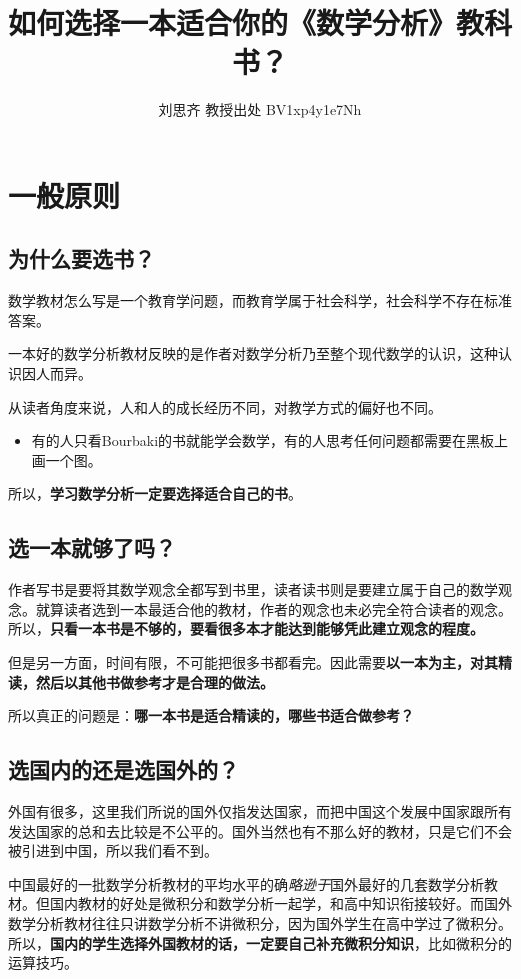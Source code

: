 \documentclass[UTF8]{article}
\title{如何选择一本适合你的《数学分析》教科书？}
\author{刘思齐 教授\qquad 出处 BV1xp4y1e7Nh}
\begin{document}
    \maketitle
    \tableofcontents
    \section{一般原则}
    \subsection{为什么要选书？}
    数学教材怎么写是一个教育学问题，而教育学属于社会科学，社会科学不存在标准答案。
    
    一本好的数学分析教材反映的是作者对数学分析乃至整个现代数学的认识，这种认识因人而异。

    从读者角度来说，人和人的成长经历不同，对教学方式的偏好也不同。
    \begin{itemize}
        \item 有的人只看Bourbaki的书就能学会数学，有的人思考任何问题都需要在黑板上画一个图。
    \end{itemize}
    所以，\textbf{学习数学分析一定要选择适合自己的书}。
    \subsection{选一本就够了吗？}
    作者写书是要将其数学观念全都写到书里，读者读书则是要建立属于自己的数学观念。就算读者选到一本最适合他的教材，作者的观念也未必完全符合读者的观念。所以，\textbf{只看一本书是不够的，要看很多本才能达到能够凭此建立观念的程度。}

    但是另一方面，时间有限，不可能把很多书都看完。因此需要\textbf{以一本为主，对其精读，然后以其他书做参考才是合理的做法。}

    所以真正的问题是：\textbf{哪一本书是适合精读的，哪些书适合做参考？}

    \subsection{选国内的还是选国外的？}
    外国有很多，这里我们所说的国外仅指发达国家，而把中国这个发展中国家跟所有发达国家的总和去比较是不公平的。国外当然也有不那么好的教材，只是它们不会被引进到中国，所以我们看不到。

    中国最好的一批数学分析教材的平均水平的确\emph{略逊于}国外最好的几套数学分析教材。但国内教材的好处是微积分和数学分析一起学，和高中知识衔接较好。而国外数学分析教材往往只讲数学分析不讲微积分，因为国外学生在高中学过了微积分。所以，\textbf{国内的学生选择外国教材的话，一定要自己补充微积分知识}，比如微积分的运算技巧。
\end{document}
